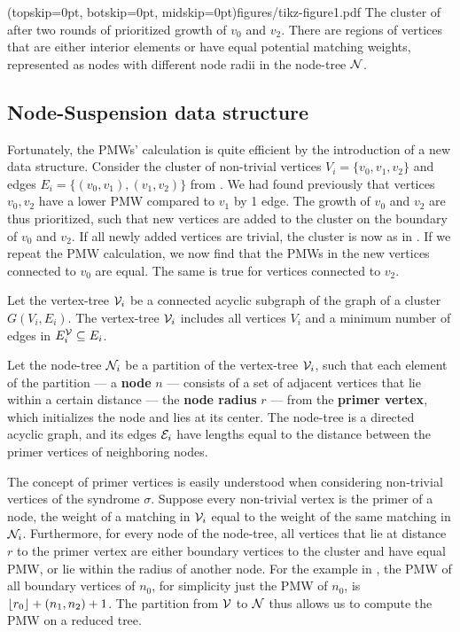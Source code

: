 \Figure[htb](topskip=0pt, botskip=0pt, midskip=0pt){figures/tikz-figure1.pdf}{
    The cluster of  after two rounds of prioritized growth of $v_0$ and $v_2$. There are regions of vertices that are either interior elements or have equal potential matching weights, represented as nodes with different node radii in the node-tree $\mathcal{N}$. \label{fig1}}

\subsection{Node-Suspension data structure}\label{sec:nodeset}

Fortunately, the PMWs' calculation is quite efficient by the introduction of a new data structure. Consider the cluster of non-trivial vertices $V_i=\{v_0,v_1,v_2\}$ and edges $E_i = \{(v_0,v_1), (v_1, v_2)\}$ from . We had found previously that vertices $v_0, v_2$ have a lower PMW compared to $v_1$ by 1 edge. The growth of $v_0$ and $v_2$ are thus prioritized, such that new vertices are added to the cluster on the boundary of $v_0$ and $v_2$. If all newly added vertices are trivial, the cluster is now as in . If we repeat the PMW calculation, we now find that the PMWs in the new vertices connected to $v_0$ are equal. The same is true for vertices connected to $v_2$. 
\begin{definition}\label{def:vertextree}
    Let the vertex-tree $\mathcal{V}_i$ be a connected acyclic subgraph of the graph of a cluster $G(V_i, E_i)$.   The vertex-tree $\mathcal{V}_i$ includes all vertices $V_i$ and a minimum number of edges in $E^{\mathcal{V}}_i \subseteq E_i$. 
\end{definition}
\begin{definition}
  Let the node-tree $\mathcal{N}_i$ be a partition of the vertex-tree $\mathcal{V}_i$, such that each element of the partition --- a \textbf{node} $n$ --- consists of a set of adjacent vertices that lie within a certain distance --- the \textbf{node radius} $r$ --- from the \textbf{primer vertex}, which initializes the node and lies at its center. The node-tree is a directed acyclic graph, and its edges $\mathcal{E}_i$ have lengths equal to the distance between the primer vertices of neighboring nodes. 
\end{definition}

The concept of primer vertices is easily understood when considering non-trivial vertices of the syndrome $\sigma$. Suppose every non-trivial vertex is the primer of a node, the weight of a matching in $\mathcal{V}_i$ equal to the weight of the same matching in $\mathcal{N}_i$. Furthermore, for every node of the node-tree, all vertices that lie at distance $r$ to the primer vertex are either boundary vertices to the cluster and have equal PMW, or lie within the radius of another node. For the example in , the PMW of all boundary vertices of $n_0$, for simplicity just the PMW of $n_0$, is ${\left \lfloor r_0 \right \rfloor } + (n_1, n_2) + 1$. The partition from $\mathcal{V}$ to $\mathcal{N}$ thus allows us to compute the PMW on a reduced tree. 

